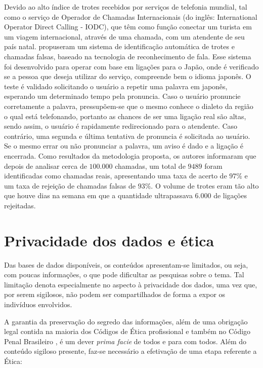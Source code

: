 Devido ao alto índice de trotes recebidos por serviços de telefonia mundial, tal como o serviço de Operador de Chamadas Internacionais (do inglês: International Operator Direct Calling - IODC), que têm como função conectar um turista em um viagem internacional, através de uma chamada, com um atendente de seu país natal. \cite{kuroiwa2004automatic} propuseram um sistema de identificação automática de trotes e chamadas falsas, baseado na tecnologia de reconhecimento de fala. Esse sistema foi desenvolvido para operar com base em ligações para o Japão, onde é verificado se a pessoa que deseja utilizar do serviço, compreende bem o idioma japonês. O teste é validado solicitando o usuário a repetir uma palavra em japonês, esperando um determinado tempo pela pronuncia. Caso o usuário pronuncie corretamente a palavra, pressupõem-se que o mesmo conhece o dialeto da região o qual está telefonando, portanto as chances de ser uma ligação real são altas, sendo assim, o usuário é rapidamente redirecionado para o atendente. Caso contrário, uma segunda e última tentativa de pronuncia é solicitada ao usuário. Se o mesmo errar ou não pronunciar a palavra, um aviso é dado e a ligação é encerrada. Como resultados da metodologia proposta, os autores informaram que depois de analisar cerca de $100.000$ chamadas, um total de $9489$ foram identificadas como chamadas reais, apresentando uma taxa de acerto de $97\%$ e um taxa de rejeição de chamadas falsas de $93\%$. O volume de trotes eram tão alto que houve dias na semana em que a quantidade ultrapassava $6.000$ de ligações rejeitadas.

\section{Privacidade dos dados e ética}
Das bases de dados disponíveis, os conteúdos apresentam-se limitados, ou seja, com poucas informações, o que pode dificultar as pesquisas sobre o tema. Tal limitação denota  especialmente no aspecto à privacidade dos dados, uma vez que, por serem sigilosos, não podem ser compartilhados de forma a expor os indivíduos envolvidos.

A garantia da preservação do segredo das informações, além de uma obrigação legal contida na maioria dos Códigos de Ética profissional e também no Código Penal Brasileiro \citep{cp340}, é um dever \textit{prima facie} de todos e para com todos. Além do conteúdo sigiloso presente, faz-se necessário a efetivação de uma etapa referente a Ética:

